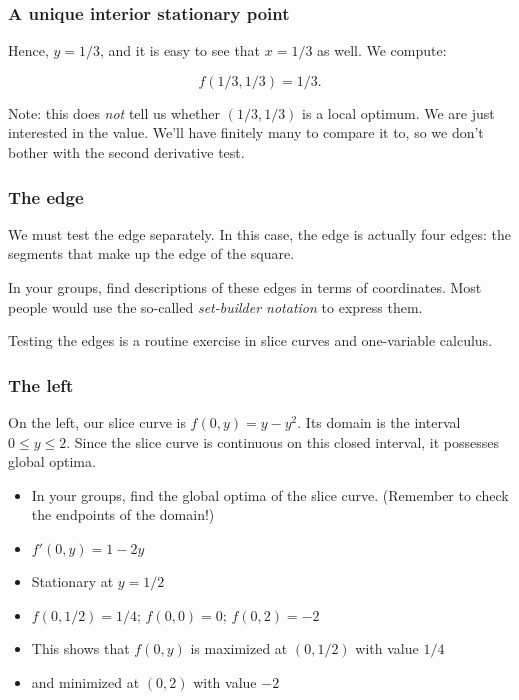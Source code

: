 \documentclass[%
  11pt,%
  ignorenonframetext,%
  xcolor={svgnames},%
  aspectratio=169%
]{beamer}
\begin{document}
\begin{frame}\frametitle{A unique interior stationary point}

Hence, $y = 1/3$, and it is easy to see that $x = 1/3$ as well. We
compute:

\begin{equation*}
    f(1/3, 1/3) = 1/3.
\end{equation*}

Note: this does \emph{not} tell us whether $(1/3, 1/3)$ is a local
optimum. We are just interested in the value. We'll have finitely many
to compare it to, so we don't bother with the second derivative test.

\end{frame}

\begin{frame}\frametitle{The edge}

We must test the edge separately. In this case, the edge is actually
four edges: the segments that make up the edge of the square.

In your groups, find descriptions of these edges in terms of coordinates.
Most people would use the so-called \emph{set-builder notation} to express
them.

Testing the edges is a routine exercise in slice curves and one-variable
calculus.

\end{frame}

\begin{frame}\frametitle{The left}

On the left, our slice curve is $f(0, y) = y - y^2$. Its domain is the
interval $0 \leq y \leq 2$. Since the slice curve is continuous on this
closed interval, it possesses global optima.

\begin{itemize}
\item
  In your groups, find the global optima of the slice curve. (Remember
  to check the endpoints of the domain!)
  \pause
\item
  $f'(0,y) = 1 - 2y$
  \pause
\item
  Stationary at $y = 1/2$
  \pause
\item
  $f(0, 1/2) = 1/4$; $f(0,0) = 0$; $f(0,2) = -2$
  \pause
\item
  This shows that $f(0,y)$ is maximized at $(0,1/2)$ with value $1/4$
  \pause
\item
  and minimized at $(0,2)$ with value $-2$
\end{itemize}

\end{frame}
\end{document}
